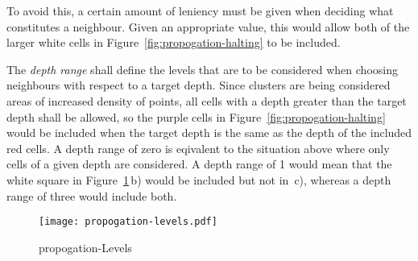 To avoid this, a certain amount of leniency must be given when deciding what
constitutes a neighbour. Given an appropriate value, this would allow both of
the larger white cells in Figure~\ref{fig:propogation-halting} to be included.

The \emph{depth range} shall define the levels that are to be considered when
choosing neighbours with respect to a target depth. Since clusters are being
considered areas of increased density of points, all cells with a depth greater
than the target depth shall be allowed, so the purple cells in
Figure~\ref{fig:propogation-halting} would be included when the target depth is
the same as the depth of the included red cells. A depth range of zero is
eqivalent to the situation above where only cells of a given depth are
considered. A depth range of 1 would mean that the white square in
Figure~\ref{fig:propogation-levels}\,b) would be included but not in~c),
whereas a depth range of three would include both.

\begin{figure}[tbhp]
	\centering
	\texttt{[image: propogation-levels.pdf]}
	\caption{propogation-Levels}
	\label{fig:propogation-levels}
\end{figure}
